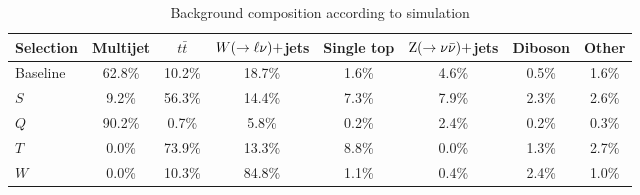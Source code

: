 \begin{table}[htpb]
\centering
\caption{Background composition according to simulation
\label{tab:BG_comp_percent}}
\vspace{1ex}
{\small
\begin{tabular}{ l  c  c  c  c  c  c  c }
\toprule
Selection & Multijet & $t\bar{t}$ & $W(\rightarrow \ell\nu)+$jets & Single top & $\mathrm{Z}(\rightarrow
\nu\bar{\nu})+$jets & Diboson & Other \\  
\midrule
Baseline & 62.8\% & 10.2\% & 18.7\% & 1.6\% & 4.6\% & 0.5\% & 1.6\% \\ 
$S$ & 9.2\% & 56.3\% & 14.4\%  & 7.3\% & 7.9\% & 2.3\% & 2.6\% \\
$Q$ & 90.2\% & 0.7\% & 5.8\%  & 0.2\% & 2.4\% & 0.2\% & 0.3\% \\
$T$ & 0.0\% & 73.9\% & 13.3\%  & 8.8\% & 0.0\% & 1.3\% & 2.7\% \\
$W$ & 0.0\% & 10.3\% & 84.8\%  & 1.1\% & 0.4\% & 2.4\% & 1.0\% \\
\bottomrule
\end{tabular}
}
\end{table}

